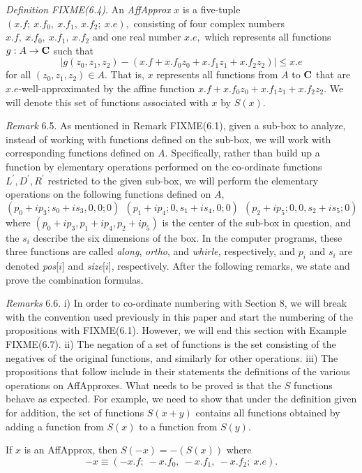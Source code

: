  {\it Definition {\rm FIXME(6.4)}}.  An {\it AffApprox}  $x$ is a five-tuple
$(x.f;\ x.f_0,\ x.f_1,\ x.f_2;\ x.e),$
consisting of four complex numbers $x.f,\ x.f_0,\ x.f_1,\ x.f_2$ and one real number $x.e,$  which represents all functions 
$g: A \rightarrow {\bf C}$ such that
$$|g(z_0,z_1,z_2) - (x.f + x.f_0 z_0 + x.f_1 z_1 + x.f _2 z_2)| \le x.e$$
for all $(z_0,z_1,z_2) \in A.$  That is, $x$ represents all functions from $A$ to ${\bf C}$ that are $x.e$-well-approximated by the affine function $x.f + x.f_0 z_0 + x.f_1 z_1 + x.f _2 z_2$.  We will denote this set of functions associated with $x$ by $S(x)$.

{\it Remark} 6.5.
As mentioned in Remark FIXME(6.1), given a sub-box to analyze, instead of working with functions defined on the sub-box, we will work with corresponding functions defined on $A.$  Specifically, rather than build up a function by elementary operations performed on the co-ordinate functions 
$L^{\prime}, D^{\prime}, R^{\prime}$ 
restricted to the given sub-box, we will perform the elementary operations on the following functions defined on $A$, 
$$(p_0 + i p_3; s_0 + i s_3,0,0; 0)\  \ (p_1 + i p_4; 0, s_1 + i s_4,0;0) \   \ (p_2 + i p_5; 0,0, s_2 + i s_5; 0)$$
where $(p_0 + i p_3, p_1 + i p_4, p_2 + i p_5)$ is the center of the sub-box in question, and the $s_i$ describe the six dimensions of the box. In the computer programs, these three functions are called {\it along}, {\it ortho}, and {\it whirle,} respectively, and $p_i$ and $s_i$
 are denoted {\it pos}[$i$] and {\it size}[$i$], respectively.
After the following remarks, we state and prove the combination formulas. 

 {\it Remarks} 6.6.
i) In order to co-ordinate numbering with Section 8, we will break with the convention used previously in this paper and start the
numbering of the propositions with FIXME(6.1). However, we will end this section with Example FIXME(6.7).
ii)  The negation of a set of functions is the set consisting of the negatives of the original functions, and similarly for other operations.
iii)  The propositions that follow include in their statements the definitions of the various operations on AffApproxes.  What needs to
be proved is that the $S$ functions behave as expected.  For example, we need to show that under the definition given for addition, the
set of functions $S(x+y)$ contains all functions obtained by adding a function from $S(x)$ to a function from $S(y).$

 If $x$ is an {\rm AffApprox,} then 
$S(-x) = -(S(x))$ where 
$$-x \equiv (-x.f;\ -x.f_0,\ -x.f_1,\ -x.f_2;\ x.e).$$ 
\endproclaim


